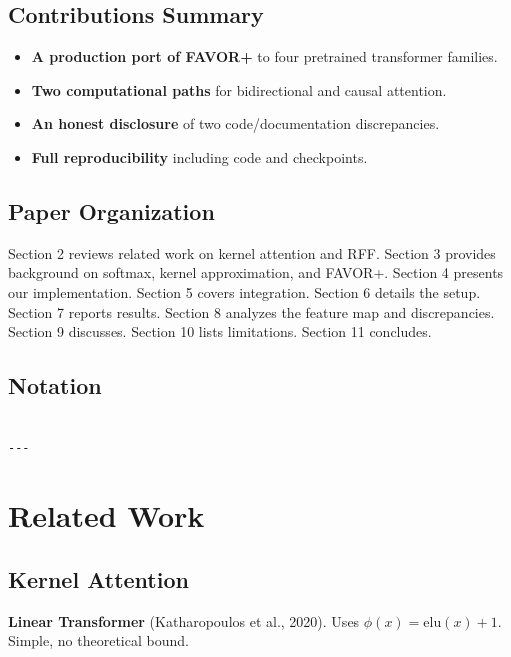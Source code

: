 \subsection{Contributions Summary}

\begin{itemize}
\item \textbf{A production port of FAVOR+} to four pretrained transformer families.
\item \textbf{Two computational paths} for bidirectional and causal attention.
\item \textbf{An honest disclosure} of two code/documentation discrepancies.
\item \textbf{Full reproducibility} including code and checkpoints.

\end{itemize}
\subsection{Paper Organization}

Section 2 reviews related work on kernel attention and RFF. Section 3 
provides background on softmax, kernel approximation, and FAVOR+. Section 4 
presents our implementation. Section 5 covers integration. Section 6 details 
the setup. Section 7 reports results. Section 8 analyzes the feature map 
and discrepancies. Section 9 discusses. Section 10 lists limitations. 
Section 11 concludes.



\subsection{Notation}

\begin{lstlisting}

---
\end{lstlisting}


\section{Related Work}

\subsection{Kernel Attention}

\textbf{Linear Transformer} (Katharopoulos et al., 2020). Uses $\phi(x) = \text{elu}(x) + 1$. 
Simple, no theoretical bound.

